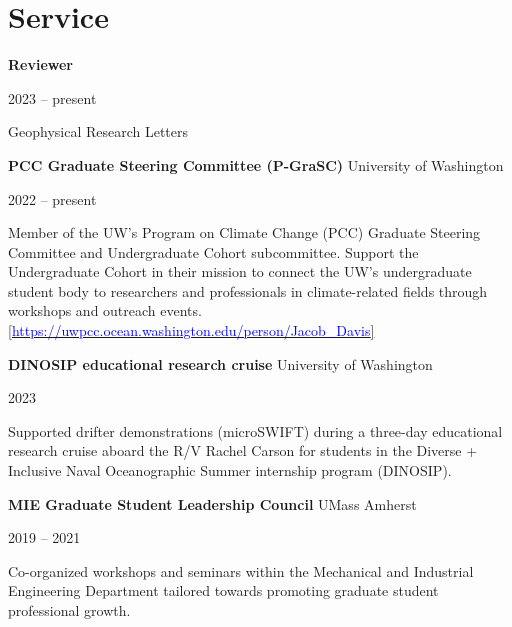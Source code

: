 \documentclass[letterpaper,11pt]{article}
\newenvironment{indentPar}[1]{
  \justifying
  \begin{list}{}{\setlength{\leftmargin}{#1}}%
  \item[]
}
{\end{list}}
\newcommand{\mentorshipExpEntry}[4]{
  \begin{minipage}[t]{.75\textwidth}
    \begin{flushleft}
      \textbf{#1}
      #2
    \end{flushleft}
  \end{minipage}
  \hfill
  \begin{minipage}[t]{.20\textwidth}
    \begin{flushright}
      #3%
    \end{flushright}
  \end{minipage}%
  \vspace{-7pt}
  \begin{indentPar}{0.5cm}
    #4%
  \end{indentPar}
}
\newcommand{\serviceExpEntry}[4]{
  \begin{minipage}[t]{.75\textwidth}
    \begin{flushleft}
      \textbf{#1}
      #2
    \end{flushleft}
  \end{minipage}
  \hfill
  \begin{minipage}[t]{.20\textwidth}
    \begin{flushright}
      #3%
    \end{flushright}
  \end{minipage}%
  \vspace{-7pt}
  \begin{indentPar}{0.5cm}
    #4%
  \end{indentPar}
}
\begin{document}
\section{Service}
\serviceExpEntry
  {Reviewer}{}
  {2023 -- present}
  {Geophysical Research Letters}

\serviceExpEntry
  {PCC Graduate Steering Committee (P-GraSC)}{University of Washington}
  {2022 -- present}
  {Member of the UW's Program on Climate Change (PCC) Graduate Steering Committee and Undergraduate Cohort subcommittee. Support the Undergraduate Cohort in their mission to connect the UW's undergraduate student body to researchers and professionals in climate-related fields through workshops and outreach events.
  \href{https://uwpcc.ocean.washington.edu/person/Jacob_Davis}{[\textcolor{blue}{https://uwpcc.ocean.washington.edu/person/Jacob\_Davis}]}}


\serviceExpEntry
  {DINOSIP educational research cruise}{University of Washington}
  {2023}
  {Supported drifter demonstrations (microSWIFT) during a three-day educational research cruise aboard the R/V Rachel Carson for students in the Diverse + Inclusive Naval Oceanographic Summer internship program (DINOSIP).}

\serviceExpEntry
  {MIE Graduate Student Leadership Council}{UMass Amherst}
  {2019 -- 2021}
  {Co-organized workshops and seminars within the Mechanical and Industrial Engineering Department tailored towards
  promoting graduate student professional growth.}

\end{document}
